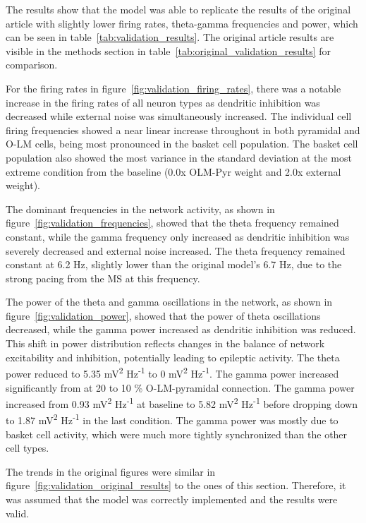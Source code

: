 The results show that the model was able to
replicate the results of the original article with slightly lower firing rates,
theta-gamma frequencies and power, which can be seen in
table~\ref{tab:validation_results}. The original article results are visible in
the methods section in table~\ref{tab:original_validation_results} for comparison.

For the firing rates in figure~\ref{fig:validation_firing_rates},
there was a notable increase in the firing rates of all neuron types as dendritic inhibition was 
decreased while external noise was simultaneously increased.
The individual cell firing frequencies showed a near linear increase throughout in both pyramidal and O-LM cells, 
being most pronounced in the basket cell population.
The basket cell population also showed the most variance in the standard deviation at the most extreme 
condition from the baseline (0.0x OLM-Pyr weight and 2.0x external weight).

The dominant frequencies in the network activity, as shown in figure~\ref{fig:validation_frequencies},
showed that the theta frequency remained constant, while the gamma frequency only increased as dendritic inhibition was severely decreased and external noise increased.
The theta frequency remained constant at 6.2 Hz, slightly lower than the original model's 6.7 Hz, due to the strong pacing from the MS at this frequency.

The power of the theta and gamma oscillations in the network, as shown in figure~\ref{fig:validation_power},
showed that the power of theta oscillations decreased, while the gamma power increased as dendritic inhibition was reduced.
This shift in power distribution reflects changes in the balance of network excitability and inhibition, potentially leading to epileptic activity.
The theta power reduced to 5.35 mV\textsuperscript{2} Hz\textsuperscript{-1} to 0 mV\textsuperscript{2} Hz\textsuperscript{-1}.
The gamma power increased significantly from at 20 to 10 \% O-LM-pyramidal connection. The gamma power increased from 0.93 mV\textsuperscript{2} Hz\textsuperscript{-1} 
at baseline to 5.82 mV\textsuperscript{2} Hz\textsuperscript{-1} before dropping down to 1.87 mV\textsuperscript{2} Hz\textsuperscript{-1} in the last condition.
The gamma power was mostly due to basket cell activity, which were much more tightly synchronized than the other cell types.

The trends in the original figures were similar in figure~\ref{fig:validation_original_results} to the ones of this section.
Therefore, it was assumed that the model was correctly implemented and the results were valid.

